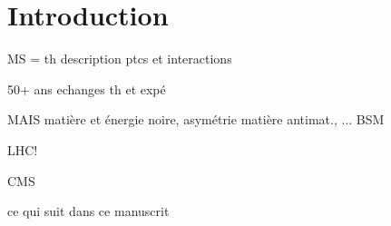\chapter{Introduction}

MS = th description ptcs et interactions

50+ ans echanges th et expé

MAIS matière et énergie noire, asymétrie matière antimat., ... BSM

LHC!

CMS

\og ce qui suit dans ce manuscrit \fg{} 